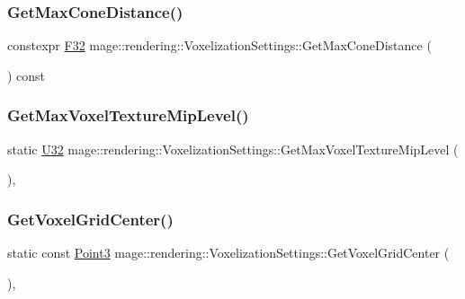 \subsubsection{\texorpdfstring{Get\+Max\+Cone\+Distance()}{GetMaxConeDistance()}}
{\footnotesize\ttfamily constexpr \hyperlink{namespacemage_aa97e833b45f06d60a0a9c4fc22ae02c0}{F32} mage\+::rendering\+::\+Voxelization\+Settings\+::\+Get\+Max\+Cone\+Distance (\begin{DoxyParamCaption}{ }\end{DoxyParamCaption}) const\hspace{0.3cm}{\ttfamily [noexcept]}}

\hypertarget{classmage_1_1rendering_1_1_voxelization_settings_aacf64e0e4be2e7260793dfefe7f332cb}{}\label{classmage_1_1rendering_1_1_voxelization_settings_aacf64e0e4be2e7260793dfefe7f332cb} 
\subsubsection{\texorpdfstring{Get\+Max\+Voxel\+Texture\+Mip\+Level()}{GetMaxVoxelTextureMipLevel()}}
{\footnotesize\ttfamily static \hyperlink{namespacemage_a41c104c036fba3756a74e19f793eeaa1}{U32} mage\+::rendering\+::\+Voxelization\+Settings\+::\+Get\+Max\+Voxel\+Texture\+Mip\+Level (\begin{DoxyParamCaption}{ }\end{DoxyParamCaption})\hspace{0.3cm}{\ttfamily [static]}, {\ttfamily [noexcept]}}

\hypertarget{classmage_1_1rendering_1_1_voxelization_settings_a3607b62516e690c192d356b59375ba18}{}\label{classmage_1_1rendering_1_1_voxelization_settings_a3607b62516e690c192d356b59375ba18} 
\subsubsection{\texorpdfstring{Get\+Voxel\+Grid\+Center()}{GetVoxelGridCenter()}}
{\footnotesize\ttfamily static const \hyperlink{structmage_1_1_point3}{Point3} mage\+::rendering\+::\+Voxelization\+Settings\+::\+Get\+Voxel\+Grid\+Center (\begin{DoxyParamCaption}{ }\end{DoxyParamCaption})\hspace{0.3cm}{\ttfamily [static]}, {\ttfamily [noexcept]}}

